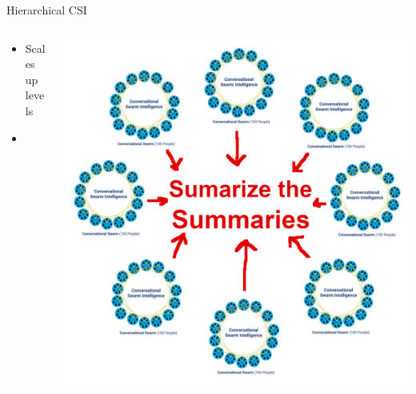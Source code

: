 \documentclass[aspectratio=169]{beamer}
\begin{document}
\begin{frame}{Hierarchical CSI}
\begin{columns}[T]
    \begin{column}[T]{0.5\textwidth}
        \begin{itemize}
            \item Scales up levels
            \item 
        \end{itemize}
    \end{column}
    \begin{column}{0.5\textwidth}
        \includegraphics[height=0.8\textheight]{imgs/CSI_section/hierarchical_summaries.png}
    \end{column}
\end{columns}
\end{frame}
\end{document}
